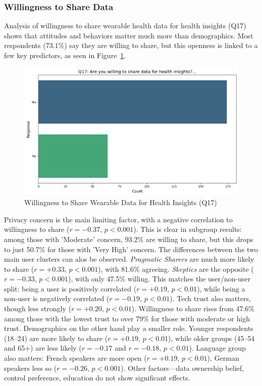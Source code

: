 	\subsubsection{Willingness to Share Data}
		Analysis of willingness to share wearable health data for health insights (Q17) shows that attitudes and behaviors matter much more than demographics. Most respondents (73.1\%) say they are willing to share, but this openness is linked to a few key predictors, as seen in Figure~\ref{fig:Q17_share}.
		\begin{figure}[ht]\centering
			\includegraphics[width=1\linewidth]{figures/questions/Q17_single_choice.png}
			\caption{Willingness to Share Wearable Data for Health Insights (Q17)}
			\label{fig:Q17_share}
		\end{figure}
		Privacy concern is the main limiting factor, with a negative correlation to willingness to share ($r = -0.37$, $p < 0.001$). This is clear in subgroup results: among those with 'Moderate' concern, 93.2\% are willing to share, but this drops to just 50.7\% for those with 'Very High' concern.
		The  differences between the two main user clusters can alos be observed. \textit{Pragmatic Sharers} are much more likely to share ($r = +0.33$, $p < 0.001$), with 81.6\% agreeing. \textit{Skeptics} are the opposite ($r = -0.33$, $p < 0.001$), with only 47.5\% willing. This matches the user/non-user split: being a user is positively correlated ($r = +0.19$, $p < 0.01$), while being a non-user is negatively correlated ($r = -0.19$, $p < 0.01$).
		Tech trust also matters, though less strongly ($r = +0.20$, $p < 0.01$). Willingness to share rises from 47.6\% among those with the lowest trust to over 79\% for those with moderate or high trust.
		Demographics on the other hand play a smaller role. Younger respondents (18--24) are more likely to share ($r = +0.19$, $p < 0.01$), while older groups (45--54 and 65+) are less likely ($r = -0.17$ and $r = -0.18$, $p < 0.01$). Language group also matters: French speakers are more open ($r = +0.19$, $p < 0.01$), German speakers less so ($r = -0.26$, $p < 0.001$). Other factors—data ownership belief, control preference, education do not show significant effects.

